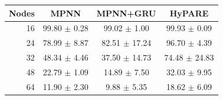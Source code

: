 \begin{tabular}{rccc}
\toprule
Nodes & MPNN & MPNN+GRU & HyPARE \\
\midrule
16 & 99.80 $\pm$ 0.28 & 99.02 $\pm$ 1.00 & 99.93 $\pm$ 0.09 \\
24 & 78.99 $\pm$ 8.87 & 82.51 $\pm$ 17.24 & 96.70 $\pm$ 4.39 \\
32 & 48.34 $\pm$ 4.46 & 37.50 $\pm$ 14.73 & 74.48 $\pm$ 24.83 \\
48 & 22.79 $\pm$ 1.09 & 14.89 $\pm$ 7.50 & 32.03 $\pm$ 9.95 \\
64 & 11.90 $\pm$ 2.30 & 9.88 $\pm$ 5.35 & 18.62 $\pm$ 6.09 \\
\bottomrule
\end{tabular}
